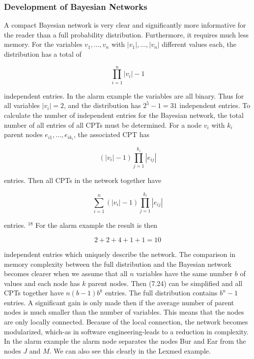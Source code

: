\documentclass[10pt]{article}
\begin{document}
\subsubsection*{Development of Bayesian Networks}
A compact Bayesian network is very clear and significantly more informative for the reader than a full probability distribution. Furthermore, it requires much less memory. For the variables $v_{1}, \ldots, v_{n}$ with $\left|v_{1}\right|, \ldots,\left|v_{n}\right|$ different values each, the distribution has a total of

$$
\prod_{i=1}^{n}\left|v_{i}\right|-1
$$

independent entries. In the alarm example the variables are all binary. Thus for all variables $\left|v_{i}\right|=2$, and the distribution has $2^{5}-1=31$ independent entries. To calculate the number of independent entries for the Bayesian network, the total number of all entries of all CPTs must be determined. For a node $v_{i}$ with $k_{i}$ parent nodes $e_{i 1}, \ldots, e_{i k_{i}}$, the associated CPT has

$$
\left(\left|v_{i}\right|-1\right) \prod_{j=1}^{k_{i}}\left|e_{i j}\right|
$$

entries. Then all CPTs in the network together have


\begin{equation*}
\sum_{i=1}^{n}\left(\left|v_{i}\right|-1\right) \prod_{j=1}^{k_{i}}\left|e_{i j}\right| \tag{7.24}
\end{equation*}


entries. ${ }^{18}$ For the alarm example the result is then

$$
2+2+4+1+1=10
$$

independent entries which uniquely describe the network. The comparison in memory complexity between the full distribution and the Bayesian network becomes clearer when we assume that all $n$ variables have the same number $b$ of values and each node has $k$ parent nodes. Then (7.24) can be simplified and all CPTs together have $n(b-1) b^{k}$ entries. The full distribution contains $b^{n}-1$ entries. A significant gain is only made then if the average number of parent nodes is much smaller than the number of variables. This means that the nodes are only locally connected. Because of the local connection, the network becomes modularized, which-as in software engineering-leads to a reduction in complexity. In the alarm example the alarm node separates the nodes Bur and Ear from the nodes $J$ and $M$. We can also see this clearly in the Lexmed example.
\end{document}
